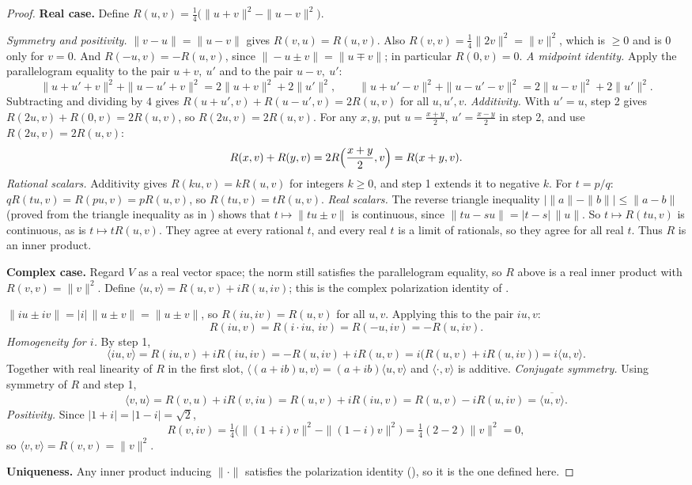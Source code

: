 \documentclass[10pt]{scrartcl}
\newcommand{\ip}[2]{\langle #1,#2\rangle}
\begin{document}
\begin{proof}
  \textbf{Real case.} Define $R(u,v)=\frac14\bigl(\|u+v\|^2-\|u-v\|^2\bigr)$.
  \begin{steps}
    \ii \emph{Symmetry and positivity.} $\|v-u\|=\|u-v\|$ gives $R(v,u)=R(u,v)$. Also $R(v,v)=\frac14\|2v\|^2=\|v\|^2$, which is $\ge0$ and is $0$ only for $v=0$. And $R(-u,v)=-R(u,v)$, since $\|-u\pm v\|=\|u\mp v\|$; in particular $R(0,v)=0$.
    \ii \emph{A midpoint identity.} Apply the parallelogram equality to the pair $u+v,\ u'$ and to the pair $u-v,\ u'$:
    \[ \|u+u'+v\|^2+\|u-u'+v\|^2=2\|u+v\|^2+2\|u'\|^2,\qquad \|u+u'-v\|^2+\|u-u'-v\|^2=2\|u-v\|^2+2\|u'\|^2. \]
    Subtracting and dividing by $4$ gives $R(u+u',v)+R(u-u',v)=2R(u,v)$ for all $u,u',v$.
    \ii \emph{Additivity.} With $u'=u$, step 2 gives $R(2u,v)+R(0,v)=2R(u,v)$, so $R(2u,v)=2R(u,v)$. For any $x,y$, put $u=\frac{x+y}2$, $u'=\frac{x-y}2$ in step 2, and use $R(2u,v)=2R(u,v)$:
    \[ R(x,v)+R(y,v)=2R\Bigl(\frac{x+y}2,v\Bigr)=R(x+y,v). \]
    \ii \emph{Rational scalars.} Additivity gives $R(ku,v)=kR(u,v)$ for integers $k\ge0$, and step 1 extends it to negative $k$. For $t=p/q$: $qR(tu,v)=R(pu,v)=pR(u,v)$, so $R(tu,v)=tR(u,v)$.
    \ii \emph{Real scalars.} The reverse triangle inequality $\bigl|\|a\|-\|b\|\bigr|\le\|a-b\|$ (proved from the triangle inequality as in ) shows that $t\mapsto\|tu\pm v\|$ is continuous, since $\|tu-su\|=|t-s|\,\|u\|$. So $t\mapsto R(tu,v)$ is continuous, as is $t\mapsto tR(u,v)$. They agree at every rational $t$, and every real $t$ is a limit of rationals, so they agree for all real $t$. Thus $R$ is an inner product.
  \end{steps}
  \textbf{Complex case.} Regard $V$ as a real vector space; the norm still satisfies the parallelogram equality, so $R$ above is a real inner product with $R(v,v)=\|v\|^2$. Define $\ip uv=R(u,v)+iR(u,iv)$; this is the complex polarization identity of .
  \begin{steps}
    \ii $\|iu\pm iv\|=|i|\,\|u\pm v\|=\|u\pm v\|$, so $R(iu,iv)=R(u,v)$ for all $u,v$. Applying this to the pair $iu,v$:
    \[ R(iu,v)=R(i\cdot iu,\,iv)=R(-u,iv)=-R(u,iv). \]
    \ii \emph{Homogeneity for $i$.} By step 1,
    \[ \ip{iu}v=R(iu,v)+iR(iu,iv)=-R(u,iv)+iR(u,v)=i\bigl(R(u,v)+iR(u,iv)\bigr)=i\ip uv. \]
    Together with real linearity of $R$ in the first slot, $\ip{(a+ib)u}{v}=(a+ib)\ip uv$ and $\ip\cdot v$ is additive.
    \ii \emph{Conjugate symmetry.} Using symmetry of $R$ and step 1,
    \[ \ip vu=R(v,u)+iR(v,iu)=R(u,v)+iR(iu,v)=R(u,v)-iR(u,iv)=\overline{\ip uv}. \]
    \ii \emph{Positivity.} Since $|1+i|=|1-i|=\sqrt2$,
    \[ R(v,iv)=\tfrac14\bigl(\|(1+i)v\|^2-\|(1-i)v\|^2\bigr)=\tfrac14(2-2)\|v\|^2=0, \]
    so $\ip vv=R(v,v)=\|v\|^2$.
  \end{steps}
  \textbf{Uniqueness.} Any inner product inducing $\|\cdot\|$ satisfies the polarization identity (), so it is the one defined here.
\end{proof}
\end{document}
